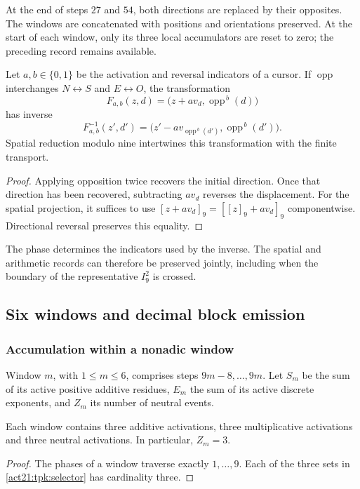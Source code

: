 At the end of steps \(27\) and \(54\), both directions are replaced by
their opposites. The windows are concatenated with positions and
orientations preserved. At the start of each window, only its three local
accumulators are reset to zero; the preceding record remains available.

\begin{proposition}
\label{act21:tpk:inversion}
Let \(a,b\in\{0,1\}\) be the activation and reversal indicators of a
cursor. If \(\operatorname{opp}\) interchanges \(N\leftrightarrow S\)
and \(E\leftrightarrow O\), the transformation
\[
 F_{a,b}(z,d)=\bigl(z+a v_d,\operatorname{opp}^{\,b}(d)\bigr)
\]
has inverse
\[
 F_{a,b}^{-1}(z',d')=
 \bigl(z'-a v_{\operatorname{opp}^{\,b}(d')},
       \operatorname{opp}^{\,b}(d')\bigr).
\]
Spatial reduction modulo nine intertwines this transformation with the
finite transport.
\end{proposition}
\begin{proof}
Applying opposition twice recovers the initial direction. Once that
direction has been recovered, subtracting \(a v_d\) reverses the
displacement. For the spatial projection, it suffices to use
\([z+a v_d]_9=[[z]_9+a v_d]_9\) componentwise. Directional reversal
preserves this equality.
\end{proof}

The phase determines the indicators used by the inverse. The spatial and
arithmetic records can therefore be preserved jointly, including when
the boundary of the representative \(I_9^2\) is crossed.

\subsection{Six windows and decimal block emission}
\label{act21:tpk:emision}

\subsubsection{Accumulation within a nonadic window}

Window \(m\), with \(1\leq m\leq6\), comprises steps
\(9m-8,\ldots,9m\). Let \(S_m\) be the sum of its active positive
additive residues, \(E_m\) the sum of its active discrete exponents, and
\(Z_m\) its number of neutral events.

\begin{lemma}
\label{act21:tpk:tres-eventos}
Each window contains three additive activations, three multiplicative
activations and three neutral activations. In particular, \(Z_m=3\).
\end{lemma}
\begin{proof}
The phases of a window traverse exactly \(1,\ldots,9\). Each of the
three sets in \eqref{act21:tpk:selector} has cardinality three.
\end{proof}

